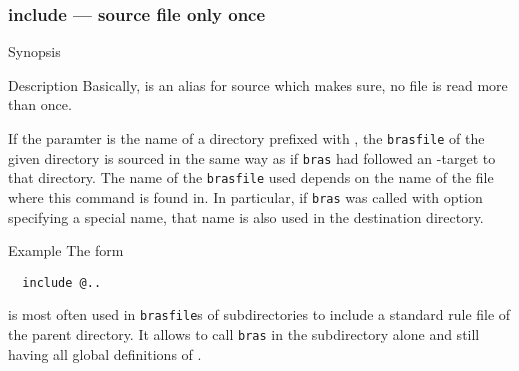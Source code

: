 \documentclass[11pt]{scrartcl}
\newcommand{\bras}{\texttt{bras}}
\newcommand{\brasfile}{\texttt{brasfile}}
\begin{document}
\subsubsection{include --- source file only once}
\label{proc:include}
\begin{Describe}
\item[Synopsis]  \\
   
\item[Description] Basically,  is an alias for source
  which makes sure, no file is read more than once. 
  
  If the paramter is the name of a directory prefixed with , the
  \brasfile{} of the given directory is sourced in the same way as if
  \bras{} had followed an -target to that directory. The name of
  the \brasfile{} used depends on the name of the file where this
  command is found in. In particular, if \bras{} was called with
  option  specifying a special name, that name is also used in
  the destination directory.
\item[Example]
  The form
  \begin{verbatim}
  include @..
  \end{verbatim}
  is most often used in \brasfile{}s of subdirectories to include a
  standard rule file of the parent directory. It allows to call
  \bras{} in the subdirectory alone and still having all global
  definitions of .
\end{Describe}

\end{document}
